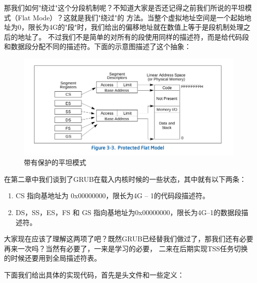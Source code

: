 \par 那我们如何"绕过"这个分段机制呢？不知道大家是否还记得之前我们所说的平坦模式（Flat Mode）？这就是我们"绕过"的\allowbreak
方法。当整个虚拟地址空间是一个起始地址为0，限长为4G的"段"时，我们给出的偏移地址就在数值上等于是段机制处理之后的地址了。
不过我们不是简单的对所有的段使用同样的描述符，而是给代码段和数据段分配不同的描述符。下面的示意图描述了这个抽象：

\begin{figure}[H]
      \centering
      \includegraphics[scale=0.5]{picture/chapt6/protected_flat_mode.png}
      \caption{带有保护的平坦模式}
\end{figure}

\par 在第二章中我们谈到了GRUB在载入内核时候的一些状态，其中就有以下两条：

\begin{mdframed}
	\begin{enumerate}
		\item CS 指向基地址为 0x00000000，限长为4G – 1的代码段描述符。
		\item DS，SS，ES，FS 和 GS 指向基地址为0x00000000，限长为4G–1的数据段描述符。
	\end{enumerate}
\end{mdframed}

\par 大家现在应该了理解这两项了吧？既然GRUB已经替我们做过了，那我们还有必要再来一次吗？当然有必要了，一来是学习的必要，\allowbreak
二来在后期实现TSS任务切换的时候还要用到全局描述符表。

\par 下面我们给出具体的实现代码，首先是头文件和一些定义：

